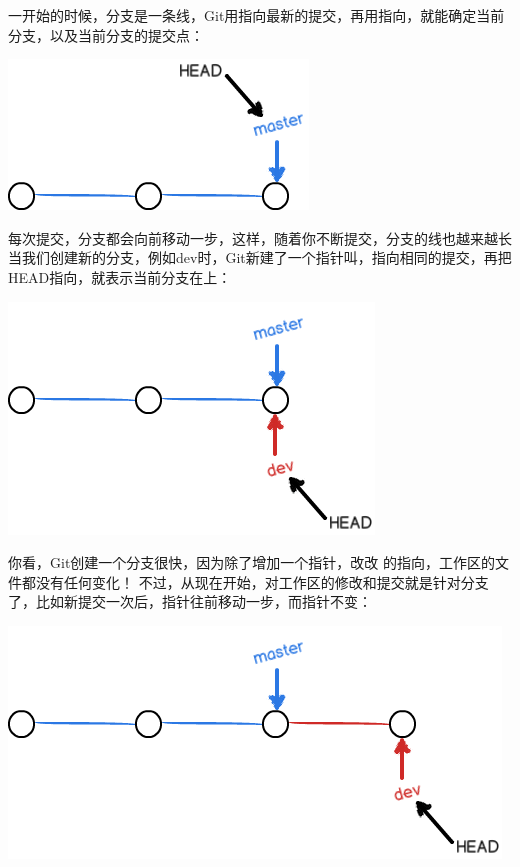 \documentclass[•]{article}
\begin{document}
\begin{CJK}{UTF8}{gbsn}
一开始的时候，分支是一条线，Git用指向最新的提交，再用指向，就能确定当前分支，以及当前分支的提交点：
\begin{center}
\includegraphics[scale=0.6]{head1.png}
\end{center}
每次提交，分支都会向前移动一步，这样，随着你不断提交，分支的线也越来越长
当我们创建新的分支，例如dev时，Git新建了一个指针叫，指向相同的提交，再把HEAD指向，就表示当前分支在上：
\begin{center}
\includegraphics[scale=0.6]{head2.png}
\end{center}
你看，Git创建一个分支很快，因为除了增加一个指针，改改 的指向，工作区的文件都没有任何变化！
不过，从现在开始，对工作区的修改和提交就是针对分支了，比如新提交一次后，指针往前移动一步，而指针不变：
\begin{center}
\includegraphics[scale=0.6]{head3.png}

\end{center}
\end{CJK}
\end{document}
